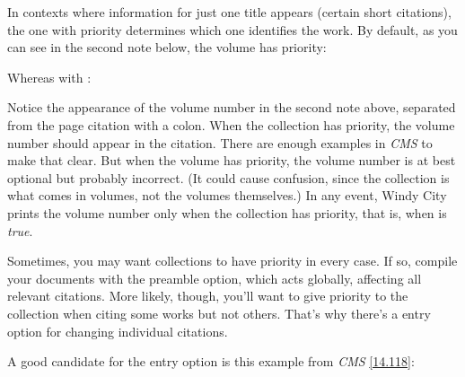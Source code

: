 \documentclass[11pt,letterpaper,oneside]{article}
\begin{document}
\begin{citebib}
\item \cite{armstrong2014}
\end{citebib}

In contexts where information for just one title appears (certain
short citations), the one with priority determines which one
identifies the work. By default, as you can see in the second note
below, the volume has priority:

\begin{citeonly}
\item \cite{armstrong2014}
\item \cite[45]{armstrong2014}
\end{citeonly}

\noindent Whereas with :

\begin{citeonly}
\item \cite{armstrong2014}
\item \cite[45]{armstrong2014}
\end{citeonly}

Notice the appearance of the volume number in the second note above,
separated from the page citation with a colon. When the collection has
priority, the volume number should appear in the citation. There are
enough examples in \textit{CMS} to make that clear. But when the
volume has priority, the volume number is at best optional but
probably incorrect. (It could cause confusion, since the collection is
what comes in volumes, not the volumes themselves.) In any event,
Windy City prints the volume number only when the collection has
priority, that is, when  is \textit{true}.

Sometimes, you may want collections to have priority in every case. If
so, compile your documents with the  preamble option,
which acts globally, affecting all relevant citations. More likely,
though, you'll want to give priority to the collection when citing
some works but not others. That's why there's a  entry
option for changing individual citations.

A good candidate for the entry option is this example from
\textit{CMS} \ref{14.118}:

\begin{citebib}
\item \cite*{james1963.5}
\end{citebib}
\end{document}
